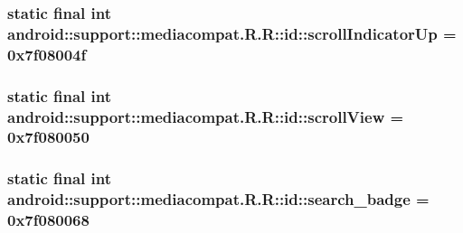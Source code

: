 \hypertarget{classandroid_1_1support_1_1mediacompat_1_1_r_1_1id_5dab84c90572bd487dec609300adfbfd}{
\subsubsection[{scrollIndicatorUp}]{\setlength{\rightskip}{0pt plus 5cm}static final int android::support::mediacompat.R.R::id::scrollIndicatorUp = 0x7f08004f}}
\label{classandroid_1_1support_1_1mediacompat_1_1_r_1_1id_5dab84c90572bd487dec609300adfbfd}


\hypertarget{classandroid_1_1support_1_1mediacompat_1_1_r_1_1id_3729930d06fe1a8838692a5f71860a38}{
\subsubsection[{scrollView}]{\setlength{\rightskip}{0pt plus 5cm}static final int android::support::mediacompat.R.R::id::scrollView = 0x7f080050}}
\label{classandroid_1_1support_1_1mediacompat_1_1_r_1_1id_3729930d06fe1a8838692a5f71860a38}


\hypertarget{classandroid_1_1support_1_1mediacompat_1_1_r_1_1id_c121d7e78dc0f78764d9284a4a7885af}{
\subsubsection[{search\_\-badge}]{\setlength{\rightskip}{0pt plus 5cm}static final int android::support::mediacompat.R.R::id::search\_\-badge = 0x7f080068}}
\label{classandroid_1_1support_1_1mediacompat_1_1_r_1_1id_c121d7e78dc0f78764d9284a4a7885af}


